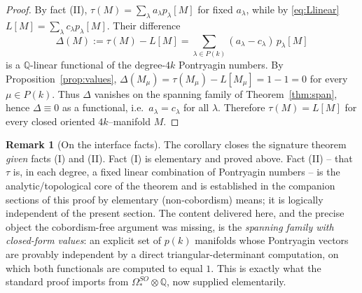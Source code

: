 \documentclass[12pt]{article}
\theoremstyle{definition}
\newtheorem{remark}{Remark}
\begin{document}
\begin{proof}
By fact (II), $\tau(M)=\sum_\lambda a_\lambda p_\lambda[M]$ for fixed $a_\lambda$, while by
\eqref{eq:Llinear} $L[M]=\sum_\lambda c_\lambda p_\lambda[M]$.  Their difference
\[
\Delta(M):=\tau(M)-L[M]=\sum_{\lambda\in P(k)}(a_\lambda-c_\lambda)\,p_\lambda[M]
\]
is a $\mathbb{Q}$-linear functional of the degree-$4k$ Pontryagin numbers.  By
Proposition~\ref{prop:values}, $\Delta(M_\mu)=\tau(M_\mu)-L[M_\mu]=1-1=0$ for every
$\mu\in P(k)$.  Thus $\Delta$ vanishes on the spanning family of
Theorem~\ref{thm:span}, hence $\Delta\equiv 0$ as a functional, i.e.\
$a_\lambda=c_\lambda$ for all $\lambda$.  Therefore $\tau(M)=L[M]$ for every closed
oriented $4k$--manifold $M$.
\end{proof}

\bigskip

\begin{remark}[On the interface facts]
The corollary closes the signature theorem \emph{given} facts (I) and (II).  Fact (I) is
elementary and proved above.  Fact (II) -- that $\tau$ is, in each degree, a fixed linear
combination of Pontryagin numbers -- is the analytic/topological core of the theorem and
is established in the companion sections of this proof by elementary (non-cobordism)
means; it is logically independent of the present section.  The content delivered here,
and the precise object the cobordism-free argument was missing, is the
\emph{spanning family with closed-form values}: an explicit set of $p(k)$ manifolds whose
Pontryagin vectors are provably independent by a direct triangular-determinant
computation, on which both functionals are computed to equal $1$.  This is exactly what
the standard proof imports from $\Omega^{SO}_\ast\otimes\mathbb{Q}$, now supplied
elementarily.
\end{remark}
\end{document}
